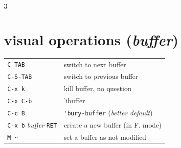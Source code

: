 \documentclass[11pt,landscape,a4paper]{article}
\begin{document}
\begin{multicols}{3}
%
%


\section{visual operations (\textit{buffer})}

\begin{tabular}{@{}ll@{}}
	{\color{darkred} \verb|C-TAB|} 	& switch to next buffer\\
	{\color{darkred} \verb|C-S-TAB|}	& switch to previous buffer\\
	{\color{darkred} \verb|C-x k|} 	& kill buffer, no question\\
	{\color{cblue} \verb|C-x C-b|} 	& 'ibuffer\\ %
	{\color{darkred}\verb|C-c B|} 	& \verb|'bury-buffer| (\textit{better default})\\
	{\verb|C-x b| \emph{buffer} \verb|RET|} & create a new buffer (in F. mode)\\ %
	{\verb|M-~|} 		& set a buffer as not modified\\ %
\end{tabular}


\end{multicols}
\end{document}
